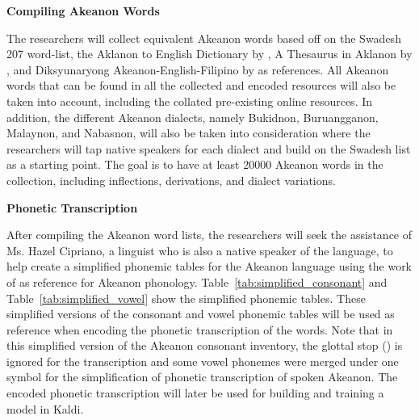 \textbf{Compiling Akeanon Words}

The researchers will collect equivalent Akeanon words based off on the Swadesh 207 word-list, the Aklanon to English Dictionary by , A Thesaurus in Aklanon by , and Diksyunaryong Akeanon-English-Filipino by  as references. All Akeanon words that can be found in all the collected and encoded resources will also be taken into account, including the collated pre-existing online resources. In addition, the different Akeanon dialects, namely Bukidnon, Buruangganon, Malaynon, and Nabasnon, will also be taken into consideration where the researchers will tap native speakers for each dialect and build on the Swadesh list as a starting point. The goal is to have at least 20000 Akeanon words in the collection, including inflections, derivations, and dialect variations.

\textbf{Phonetic Transcription}

After compiling the Akeanon word lists, the researchers will seek the assistance of Ms. Hazel Cipriano, a linguist who is also a native speaker of the language, to help create a simplified phonemic tables for the Akeanon language using the work of  as reference for Akeanon phonology. Table~\ref{tab:simplified_consonant} and Table~\ref{tab:simplified_vowel} show the simplified phonemic tables. These simplified versions of the consonant and vowel phonemic tables will be used as reference when encoding the phonetic transcription of the words. Note that in this simplified version of the Akeanon consonant inventory, the glottal stop () is ignored for the transcription and some vowel phonemes were merged under one symbol for the simplification of phonetic transcription of spoken Akeanon. The encoded phonetic transcription will later be used for building and training a model in Kaldi.


